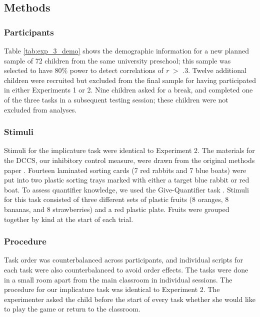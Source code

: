 \documentclass[man]{apa2}
\begin{document}
\subsection{Methods}

\subsubsection{Participants}

Table \ref{tab:exp_3_demo} shows the demographic information for a new planned sample of 72 children from the same university preschool; this sample was selected to have 80\% power to detect correlations of \emph{r} $>$ .3. Twelve additional children were recruited but excluded from the final sample for having participated in either Experiments 1 or 2. Nine children asked for a break, and completed one of the three tasks in a subsequent testing session; these children were not excluded from analyses.


\subsubsection{Stimuli} Stimuli for the implicature task were identical to Experiment 2. The materials for the DCCS, our inhibitory control measure, were drawn from the original methods paper \cite{zelazo2006}. Fourteen laminated sorting cards (7 red rabbits and 7 blue boats) were put into two plastic sorting trays marked with either a target blue rabbit or red boat. To assess quantifier knowledge, we used the Give-Quantifier task \cite{barner2009}. Stimuli for this task consisted of three different sets of plastic fruits (8 oranges, 8 bananas, and 8 strawberries) and a red plastic plate. Fruits were grouped together by kind at the start of each trial.

\subsubsection{Procedure}
Task order was counterbalanced across participants, and individual scripts for each task were also counterbalanced to avoid order effects. The tasks were done in a small room apart from the main classroom in individual sessions. The procedure for our implicature task was identical to Experiment 2. The experimenter asked the child before the start of every task whether she would like to play the game or return to the classroom.
\end{document}
